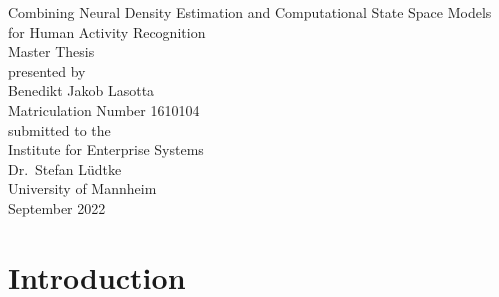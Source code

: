 \documentclass[11pt,titlepage,oneside,openany]{book}
\begin{document}
\begin{titlepage}
	\vspace*{2cm}
  \begin{center}
   {\Large Combining Neural Density Estimation and Computational State Space Models for Human Activity Recognition\\}
   \vspace{2cm} 
   {Master Thesis\\}
   \vspace{2cm}
   {presented by\\
    Benedikt Jakob Lasotta \\
    Matriculation Number 1610104\\
   }
   \vspace{1cm} 
   {submitted to the\\
    Institute for Enterprise Systems\\
    Dr.\ Stefan L\"udtke\\
    University of Mannheim\\} \vspace{2cm}
   {September 2022}
  \end{center}
\end{titlepage} 

\tableofcontents
\newpage

\listofalgorithms

\listoffigures

\listoftables


\newpage



\chapter{Introduction}
\label{cha:intro}

\end{document}
